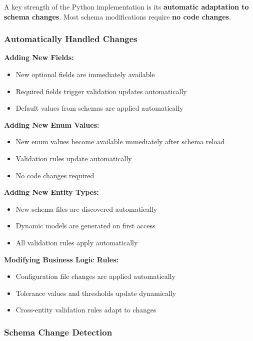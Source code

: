 A key strength of the Python implementation is its \textbf{automatic adaptation to schema changes}. Most schema modifications require \textbf{no code changes}.

\subsubsection{Automatically Handled Changes}
\label{sec:python-auto-changes}

\textbf{Adding New Fields:}
\begin{itemize}
    \item New optional fields are immediately available
    \item Required fields trigger validation updates automatically
    \item Default values from schemas are applied automatically
\end{itemize}

\textbf{Adding New Enum Values:}
\begin{itemize}
    \item New enum values become available immediately after schema reload
    \item Validation rules update automatically
    \item No code changes required
\end{itemize}

\textbf{Adding New Entity Types:}
\begin{itemize}
    \item New schema files are discovered automatically
    \item Dynamic models are generated on first access
    \item All validation rules apply automatically
\end{itemize}

\textbf{Modifying Business Logic Rules:}
\begin{itemize}
    \item Configuration file changes are applied automatically
    \item Tolerance values and thresholds update dynamically
    \item Cross-entity validation rules adapt to changes
\end{itemize}

\subsubsection{Schema Change Detection}
\label{sec:python-change-detection}

